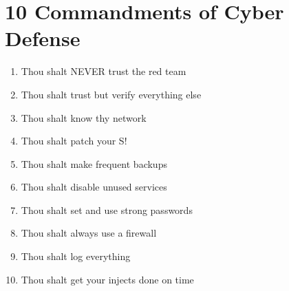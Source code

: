 \begingroup
\let\clearpage\relax
\chapter*{10 Commandments of Cyber Defense}
\begin{multicols}{2}
\begin{enumerate}
    \item Thou shalt NEVER trust the red team
    \item Thou shalt trust but verify everything else
    \item Thou shalt know thy network
    \item Thou shalt patch your S!
    \item Thou shalt make frequent backups
    \item Thou shalt disable unused services
    \item Thou shalt set and use strong passwords
    \item Thou shalt always use a firewall
    \item Thou shalt log everything
    \item Thou shalt get your injects done on time
\end{enumerate}
\end{multicols}
\endgroup
